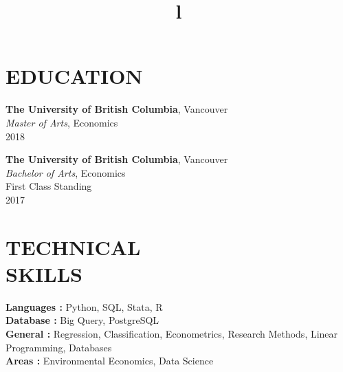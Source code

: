 \documentclass[margin]{res}
\begin{document}
\begin{resume}

\section{EDUCATION}
\textbf{The University of British Columbia}, Vancouver\\
{\sl Master of Arts}, Economics\\
2018

\textbf{The University of British Columbia}, Vancouver\\
{\sl Bachelor of Arts}, Economics\\
First Class Standing \\
2017



\section{TECHNICAL\\SKILLS}

\textbf{Languages : } Python, SQL, Stata, R
\\
\textbf{Database :} Big Query, PostgreSQL
\\
\textbf{General : } Regression, Classification, Econometrics, Research Methods, Linear Programming, Databases
\\
\textbf{Areas : } Environmental Economics, Data Science 

\begin{format}
\title{l}\\
\\
\body\\
\end{format}



\end{resume}
\end{document}
